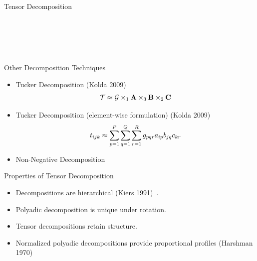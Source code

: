 \documentclass[handout]{beamer}
\begin{document}
\begin{frame}{Tensor Decomposition}
\begin{columns}
\begin{figure}
{  }\\
\end{figure}
\end{columns}
\end{frame}

\begin{frame}{Other Decomposition Techniques}
  \begin{itemize}
  \item Tucker Decomposition (Kolda 2009)~\cite{kolda2009}
    \[
      \mathcal{T} \approx \mathcal{G} \times_1 \mathrm{\bf A} \times_3 \mathrm{\bf B} \times_2
  \mathrm{\bf C}
\]
  \item Tucker Decomposition (element-wise formulation) (Kolda
    2009)~\cite{kolda2009}
    \[
        t_{ijk} \approx \displaystyle\sum_{p=1}^P \displaystyle\sum_{q=1}^Q \displaystyle\sum_{r=1}^R
  g_{pqr}a_{ip}b_{jq}c_{kr}
\]
\item Non-Negative Decomposition
  \end{itemize}
\end{frame}

\begin{frame}{Properties of Tensor Decomposition}
  \begin{itemize}[<+->]
  \item Decompositions are hierarchical (Kiers 1991)~\cite{kiers1991}.
  \item Polyadic decomposition is unique under rotation.
  \item Tensor decompositions retain structure.
  \item Normalized polyadic decompositions provide proportional
    profiles (Harshman 1970)~\cite{harshman1970}
  \end{itemize}
\end{frame}
\end{document}
